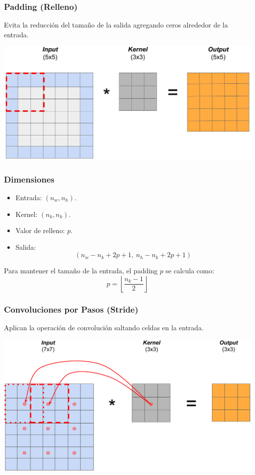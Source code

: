 \begin{frame}
    \frametitle{Padding (Relleno)}

    Evita la reducción del tamaño de la salida agregando ceros alrededor de la entrada.

    \centering
    \includegraphics[width=0.67\linewidth]{Figuras/Img08.png}
\end{frame}

\begin{frame}
    \frametitle{Dimensiones}

    \begin{itemize}
        \item Entrada: $(n_w,n_h)$.
        \item Kernel: $(n_k,n_k)$.
        \item Valor de relleno: $p$.
        \item Salida: 
        \[
            (n_w-n_k+2p+1,\ n_h-n_k+2p+1)
        \]
    \end{itemize}

    Para mantener el tamaño de la entrada, el padding \(p\) se calcula como:
    \[
        p = \left\lfloor \frac{n_k - 1}{2} \right\rfloor
    \]
    
\end{frame}

\begin{frame}
    \frametitle{Convoluciones por Pasos (Stride)}

    Aplican la operación de convolución saltando celdas en la entrada.
    
    \centering
    \includegraphics[width=0.67\linewidth]{Figuras/Img09.png}

\end{frame}

